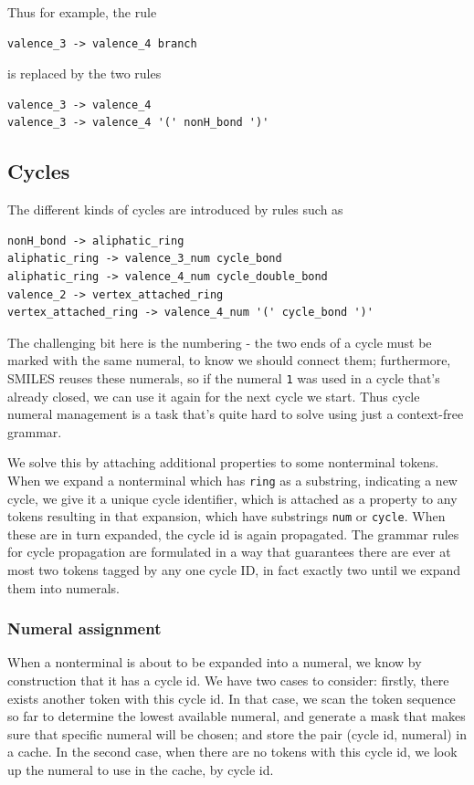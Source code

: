 \documentclass{article}
\begin{document}
Thus for example, the rule
{\footnotesize 
\begin{verbatim}
valence_3 -> valence_4 branch
\end{verbatim}} is replaced by the two rules
{\footnotesize 
	\begin{verbatim}
valence_3 -> valence_4
valence_3 -> valence_4 '(' nonH_bond ')'
\end{verbatim}}
\subsection{Cycles}
The different kinds of cycles are introduced by rules such as 
{\footnotesize \begin{verbatim}
nonH_bond -> aliphatic_ring
aliphatic_ring -> valence_3_num cycle_bond
aliphatic_ring -> valence_4_num cycle_double_bond
valence_2 -> vertex_attached_ring
vertex_attached_ring -> valence_4_num '(' cycle_bond ')'
\end{verbatim}}
The challenging bit here is the numbering - the two ends of a cycle must be marked with the same numeral, to know we should connect them; furthermore, SMILES reuses these numerals, so if the numeral \verb|1| was used in a cycle that's already closed, we can use it again for the next cycle we start. Thus cycle numeral management is a task that's quite hard to solve using just a context-free grammar.

We solve this by attaching additional properties to some nonterminal tokens. When we expand a nonterminal which has \verb|ring| as a substring, indicating a new cycle, we give it a unique cycle identifier, which is attached as a property to any tokens resulting in that expansion, which have substrings \verb|num| or \verb|cycle|. When these are in turn expanded, the cycle id is again propagated. The grammar rules for cycle propagation are formulated in a way that guarantees there are ever at most two tokens tagged by any one cycle ID, in fact exactly two until we expand them into numerals.
\subsubsection{Numeral assignment}
When a nonterminal is about to be expanded into a numeral, we know by construction that it has a cycle id. We have two cases to consider: firstly, there exists another token with this cycle id. In that case, we scan the token sequence so far to determine the lowest available numeral, and generate a mask that makes sure that specific numeral will be chosen; and store the pair (cycle id, numeral) in a cache. In the second case, when there are no tokens with this cycle id, we look up the numeral to use in the cache, by cycle id.
\end{document}
